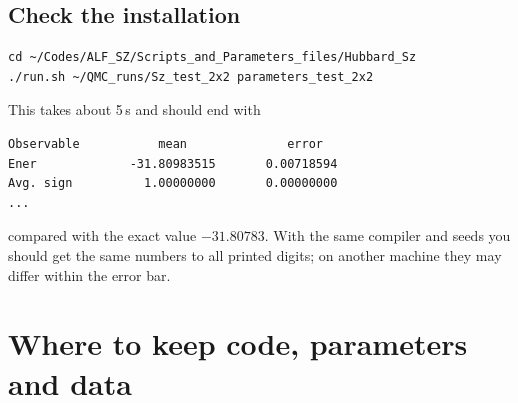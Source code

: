 \documentclass[11pt,a4paper]{article}
\begin{document}
\subsection{Check the installation}
\begin{lstlisting}
cd ~/Codes/ALF_SZ/Scripts_and_Parameters_files/Hubbard_Sz
./run.sh ~/QMC_runs/Sz_test_2x2 parameters_test_2x2
\end{lstlisting}
This takes about 5\,s and should end with
\begin{lstlisting}
Observable           mean              error
Ener             -31.80983515       0.00718594
Avg. sign          1.00000000       0.00000000
...
\end{lstlisting}
compared with the exact value $-31.80783$. With the same compiler and seeds you should get
the same numbers to all printed digits; on another machine they may differ within the error
bar.

\section{Where to keep code, parameters and data}
\label{sec:layout}
\end{document}
